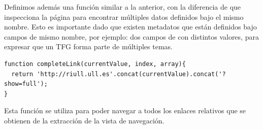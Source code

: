 Definimos además una función similar a la anterior, con la diferencia de que inspecciona la página para encontrar múltiples datos definidos bajo el mismo nombre. Esto es importante dado que existen metadatos que están definidos bajo campos de mismo nombre, por ejemplo: dos campos de  con distintos valores, para expresar que un TFG forma parte de múltiples temas.

\begin{center}
\begin{minipage}{\linewidth}
\begin{lstlisting}[caption=Concatenación de la URL absoluta con el enlace relativo.]
function completeLink(currentValue, index, array){
  return 'http://riull.ull.es'.concat(currentValue).concat('?show=full');
}
\end{lstlisting}
\end{minipage}
\end{center}

Esta función se utiliza para poder navegar a todos los enlaces relativos que se obtienen de la extracción de la vista de navegación.
%


